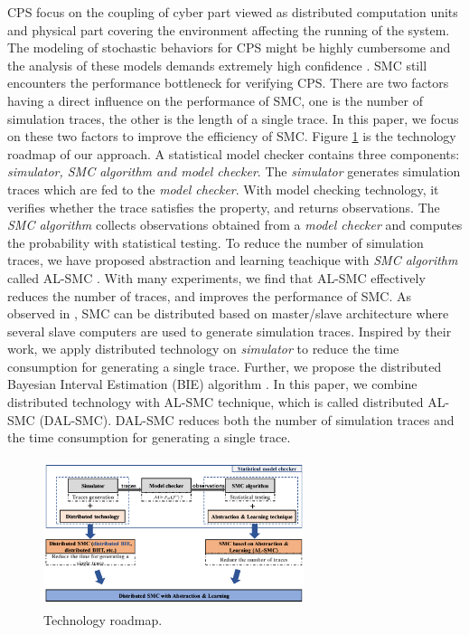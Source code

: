 CPS focus on the coupling of cyber part viewed as distributed computation units and physical part covering the environment affecting the running of the system. The modeling of stochastic behaviors for CPS might be highly cumbersome \cite{basu2010statistical} and the analysis of these models demands extremely high confidence \cite{du2015smc4rare}. SMC still encounters the performance bottleneck for verifying CPS. There are two factors having a direct influence on the performance of SMC, one is the number of simulation traces, the other is the length of a single trace.  In this paper, we focus on these two factors to improve the efficiency of SMC. Figure \ref{tech-map} is the technology roadmap of our approach. A statistical model checker contains three components: \emph{simulator, SMC algorithm and model checker}. The \emph{simulator} generates simulation traces which are fed to the \emph{model checker}.  With model checking technology, it verifies whether the trace satisfies the property, and returns observations. The \emph{SMC algorithm} collects observations obtained from a \emph{model checker} and computes the probability with statistical testing. To reduce the number of simulation traces, we have proposed abstraction and learning teachique with \emph{SMC algorithm} called AL-SMC \cite{jiangkaiqiang2016}. With many experiments, we find that AL-SMC effectively reduces the number of traces, and improves the performance of SMC. As observed in \cite{younes2005ymer}, SMC can be distributed based on master/slave architecture where several slave computers are used to generate simulation traces. Inspired by their work, we apply distributed technology on \emph{simulator} to reduce the time consumption for generating a single trace. Further, we propose the distributed Bayesian Interval Estimation (BIE) algorithm \cite{zuliani2013bayesian}. In this paper, we combine distributed technology with AL-SMC technique, which is called distributed AL-SMC (DAL-SMC).  DAL-SMC reduces both the number of simulation traces and the time consumption for generating a single trace.
\begin{figure}[htbp]
	{
	\centering	
	\includegraphics[width=3.0in,height=1.7in]{fig/paper-framework.png}
\caption{Technology roadmap.}\label{tech-map}	
	}
	
\end{figure}
